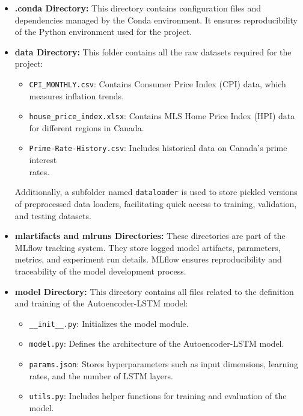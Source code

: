 \begin{itemize}
    \item \textbf{.conda Directory:} This directory contains configuration files and dependencies managed by the Conda environment. It ensures reproducibility of the Python environment used for the project.
    
    \item \textbf{data Directory:} This folder contains all the raw datasets required for the project:
    \begin{itemize}
        \item \texttt{CPI\_MONTHLY.csv}: Contains Consumer Price Index (CPI) data, which measures inflation trends.
        \item \texttt{house\_price\_index.xlsx}: Contains MLS Home Price Index (HPI) data for different regions in Canada.
        \item \texttt{Prime-Rate-History.csv}: Includes historical data on Canada's prime interest \\rates.
    \end{itemize}
    Additionally, a subfolder named \texttt{dataloader} is used to store pickled versions of preprocessed data loaders, facilitating quick access to training, validation, and testing datasets.
    
    \item \textbf{mlartifacts and mlruns Directories:} These directories are part of the MLflow tracking system. They store logged model artifacts, parameters, metrics, and experiment run details. MLflow ensures reproducibility and traceability of the model development process.
    
    \item \textbf{model Directory:} This directory contains all files related to the definition and training of the Autoencoder-LSTM model:
    \begin{itemize}
        \item \texttt{\_\_init\_\_.py}: Initializes the model module.
        \item \texttt{model.py}: Defines the architecture of the Autoencoder-LSTM model.
        \item \texttt{params.json}: Stores hyperparameters such as input dimensions, learning rates, and the number of LSTM layers.
        \item \texttt{utils.py}: Includes helper functions for training and evaluation of the model.
    \end{itemize}
    

\end{itemize}
